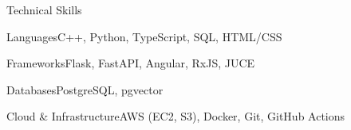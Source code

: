 \documentclass[
	11pt
]{../../../template}
\begin{document}
	\begin{rSection}{T}{echnical Skills}
		\begin{rSet}{Languages}{C++, Python, TypeScript, SQL, HTML/CSS}
		\end{rSet}
		\begin{rSet}{Frameworks}{Flask, FastAPI, Angular, RxJS, JUCE}
		\end{rSet}
		\begin{rSet}{Databases}{PostgreSQL, pgvector}
		\end{rSet}
		\begin{rSet}{Cloud \& Infrastructure}{AWS (EC2, S3), Docker, Git, GitHub Actions}
		\end{rSet}
	\end{rSection}
\end{document}
